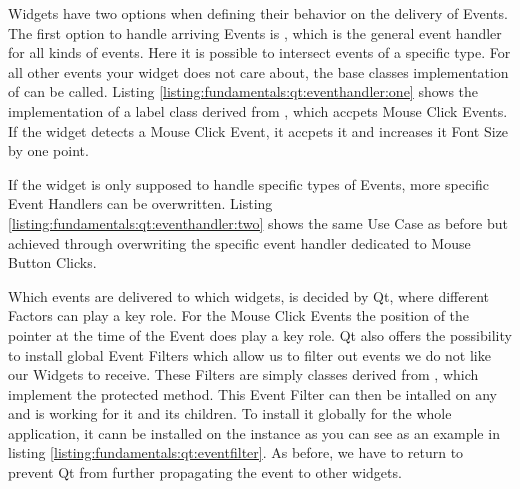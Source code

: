 Widgets have two options when defining their behavior on the delivery of Events.
The first option to handle arriving Events is
, which is the general event handler
for all kinds of events. Here it is possible to intersect events of a specific
type. For all other events your widget does not care about, the base classes
implementation of  can be called. Listing
\ref{listing:fundamentals:qt:eventhandler:one} shows the implementation of a
label class derived from , which accpets
Mouse Click Events. If the widget detects a Mouse Click Event, it accpets it and
increases it Font Size by one point.



If the widget is only supposed to handle specific types of Events, more specific
Event Handlers can be overwritten. Listing
\ref{listing:fundamentals:qt:eventhandler:two} shows the same Use Case as before
but achieved through overwriting the specific event handler dedicated to Mouse
Button Clicks.



Which events are delivered to which widgets, is decided by Qt, where different
Factors can play a key role. For the Mouse Click Events the position of the
pointer at the time of the Event does play a key role. Qt also offers the
possibility to install global Event Filters which allow us to filter out events
we do not like our Widgets to receive. These Filters are simply classes derived
from , which implement the
 protected method. This Event
Filter can then be intalled on any  and is
working for it and its children. To install it globally for the whole
application, it cann be installed on the
 instance as you can see as an example
in listing \ref{listing:fundamentals:qt:eventfilter}. As before, we have to
return  to prevent Qt from further propagating the
event to other widgets.

